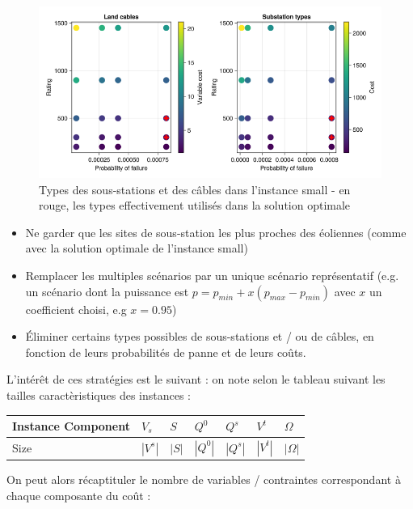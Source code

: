 \documentclass[a4paper,12pt]{article}
\begin{document}
\begin{figure}[h]
    \centering
    \includegraphics[scale=0.5]{small-types.png}
    \caption{Types des sous-stations et des câbles dans l'instance small - en rouge, les types effectivement utilisés dans la solution optimale}
\end{figure}

\begin{itemize}
    \item Ne garder que les sites de sous-station les plus proches des éoliennes (comme avec la solution optimale de l'instance small)
    \item Remplacer les multiples scénarios par un unique scénario représentatif (e.g. un scénario dont la puissance est $p = p_{min} + x(p_{max} - p_{min})$ avec $x$ un coefficient choisi, e.g $x = 0.95$)
    \item Éliminer certains types possibles de sous-stations et / ou de câbles, en fonction de leurs probabilités de panne et de leurs coûts.
\end{itemize}

L'intérêt de ces stratégies est le suivant : on note selon le tableau suivant les tailles caractèristiques des instances :

\begin{table}[h]
    \centering
    \begin{tabular}{l|llllll}
    Instance Component & $ V_s $  & $ S $    & $ Q^0 $  & $ Q^s $  & $ V^t $  & $ \Omega$\\ \hline
    Size               & $|V^s|$ & $|S|$ & $|Q^0|$ & $|Q^s|$ & $|V^t|$ & $|\Omega|$ \\
    \end{tabular}
\end{table}

On peut alors récaptituler le nombre de variables / contraintes correspondant à chaque composante du coût :
\end{document}
